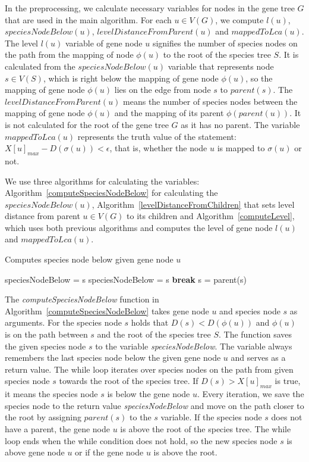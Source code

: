 In the preprocessing, we calculate necessary variables for nodes in the gene tree $G$ that are used in the main algorithm. For each $u \in V(G)$, we compute $l(u)$, $speciesNodeBelow(u)$, $levelDistanceFromParent(u)$ and $mappedToLca(u)$. The level $l(u)$ variable of gene node $u$ signifies the number of species nodes on the path from the mapping of node $\phi(u)$ to the root of the species tree $S$. It is calculated from the $speciesNodeBelow(u)$ variable that represents node $s \in V(S)$, which is right below the mapping of gene node $\phi(u)$, so the mapping of gene node $\phi(u)$ lies on the edge from node $s$ to $parent(s)$. The $levelDistanceFromParent(u)$ means the number of species nodes between the mapping of gene node $\phi(u)$ and the mapping of its parent $\phi(parent(u))$. It is not calculated for the root of the gene tree $G$ as it has no parent. The variable $mappedToLca(u)$ represents the truth value of the statement: $X[u]_{max} - D(\sigma(u)) < \epsilon$, that is, whether the node $u$ is mapped to $\sigma(u)$ or not. 

We use three algorithms for calculating the variables: Algorithm~\ref{computeSpeciesNodeBelow} for calculating the $speciesNodeBelow(u)$, Algorithm~\ref{levelDistanceFromChildren} that sets level distance from parent $u \in V(G)$ to its children and Algorithm~\ref{computeLevel}, which uses both previous algorithms and computes the level of gene node $l(u)$ and $mappedToLca(u)$.

\begin{algorithm}[!htbp]
\caption{Computes species node below given gene node $u$} 
\label{computeSpeciesNodeBelow}
\begin{algorithmic}[1]
	\State speciesNodeBelow = s
		\State speciesNodeBelow = s
			\State \textbf{break}
		\Else
			\State s = parent(s)
		\EndIf
	\EndWhile
\EndFunction
\end{algorithmic}
\end{algorithm}

The \emph{computeSpeciesNodeBelow} function in Algorithm~\ref{computeSpeciesNodeBelow} takes gene node $u$ and species node $s$ as arguments. For the species node $s$ holds that $D(s) < D(\phi(u))$ and $\phi(u)$ is on the path between $s$ and the root of the species tree $S$. The function saves the given species node $s$ to the variable \emph{speciesNodeBelow}. The variable always remembers the last species node below the given gene node $u$ and serves as a return value. The while loop iterates over species nodes on the path from given species node $s$ towards the root of the species tree. If $D(s) > X[u]_{max}$ is true, it means the species node $s$ is below the gene node $u$. Every iteration, we save the species node to the return value \emph{speciesNodeBelow} and move on the path closer to the root by assigning $parent(s)$ to the $s$ variable. If the species node $s$ does not have a parent, the gene node $u$ is above the root of the species tree. The while loop ends when the while condition does not hold, so the new species node $s$ is above gene node $u$ or if the gene node $u$ is above the root.

